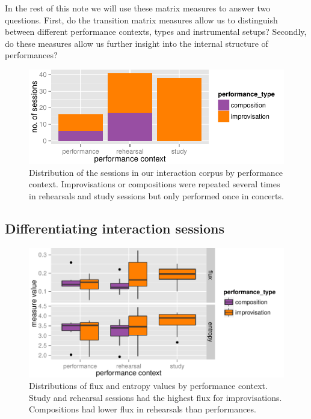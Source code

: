 \documentclass{sigchi}
\begin{document}
In the rest of this note we will use these matrix measures to answer
two questions. First, do the transition matrix measures allow us to
distinguish between different performance contexts, types and
instrumental setups? Secondly, do these measures allow us further
insight into the internal structure of performances?

\begin{figure}
  \centering
  \includegraphics[width=\linewidth]{figures/sessions-count}
  \caption{Distribution of the sessions in our interaction corpus by
    performance context. Improvisations or compositions were repeated
    several times in rehearsals and study sessions but only performed
    once in concerts.
    \label{fig:count-data}}
\end{figure}


\subsection{Differentiating interaction sessions}
\label{differentiating-interaction-sessions}

\begin{figure} \centering
  \includegraphics[width=\linewidth]{figures/context-flux-entropy-boxplot}
  \caption{Distributions of flux and entropy values by performance
context. Study and rehearsal sessions had the highest flux for
improvisations. Compositions had lower
flux in rehearsals than performances.
\label{fig:flux-entropy-boxplot}}
\end{figure}
\end{document}
